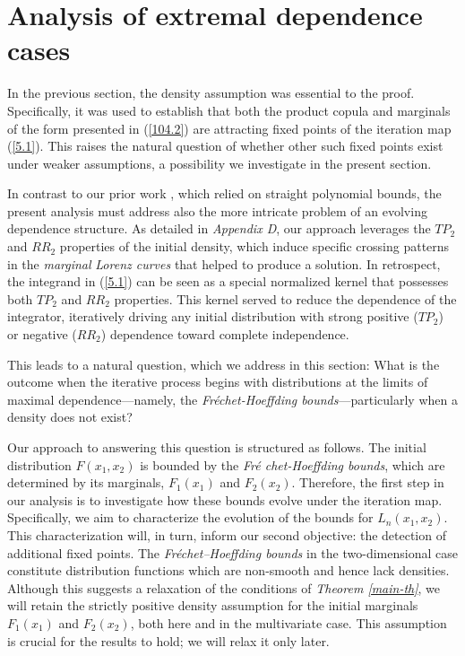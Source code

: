 \documentclass[onecolumn]{article}
\begin{document}
\section{Analysis of extremal dependence cases}

In the previous section, the density assumption was essential to the proof.
Specifically, it was used to establish that both the product copula and
marginals of the form presented in (\ref{104.2}) are attracting fixed points
of the iteration map (\ref{5.1}). This raises the natural question of
whether other such fixed points exist under weaker assumptions, a
possibility we investigate in the present section.

In contrast to our prior work \cite{[3]}, which relied on straight
polynomial bounds, the present analysis must address also the more intricate
problem of an evolving dependence structure. As detailed in \textit{Appendix
D}, our approach leverages the $TP_{2}$ and $RR_{2}$ properties of the
initial density, which induce specific crossing patterns in the \textit{%
marginal} \textit{Lorenz curves} that helped to produce a solution. In
retrospect, the integrand in (\ref{5.1}) can be seen as a special normalized
kernel that possesses both $TP_{2}$ and $RR_{2}$ properties. This kernel
served to reduce the dependence of the integrator, iteratively driving any
initial distribution with strong positive ($TP_{2}$) or negative ($RR_{2}$)
dependence toward complete independence.

This leads to a natural question, which we address in this section: What is
the outcome when the iterative process begins with distributions at the
limits of maximal dependence---namely, the \textit{Fr\'{e}chet-Hoeffding
bounds}---particularly when a density does not exist?

Our approach to answering this question is structured as follows. The
initial distribution $F(x_{1},x_{2})$ is bounded by the \textit{Fr\'{e}%
chet-Hoeffding bounds}, which are determined by its marginals, $F_{1}(x_{1})$
and $F_{2}(x_{2})$. Therefore, the first step in our analysis is to
investigate how these bounds evolve under the iteration map. Specifically,
we aim to characterize the evolution of the bounds for $L_{n}(x_{1},x_{2})$.
This characterization will, in turn, inform our second objective: the
detection of additional fixed points. The \textit{Fr\'{e}chet--Hoeffding
bounds} in the two-dimensional case constitute distribution functions which
are non-smooth and hence lack densities. Although this suggests a relaxation
of the conditions of \textit{Theorem \ref{main-th}}, we will retain the
strictly positive density assumption for the initial marginals $F_{1}(x_{1})$
and $F_{2}(x_{2})$, both here and in the multivariate case. This assumption
is crucial for the results to hold; we will relax it only later.
\end{document}
